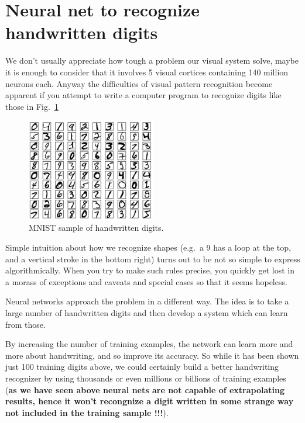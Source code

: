 \section{Neural net to recognize handwritten
		digits}\label{neural-net-to-recognize-handwritten-digits}

We don't usually appreciate how tough a problem our visual system solve,
maybe it is enough to consider that it involves 5 visual cortices
containing 140 million neurons each. Anyway the difficulties of visual
pattern recognition become apparent if you attempt to write a computer
program to recognize digits like those in Fig.~\ref{fig:mnist}

\begin{figure}[htb]
	\centering
	\includegraphics[width=0.5\textwidth]{figures/mnist_100_digits}
	\caption{MNIST sample of handwritten digits.}
	\label{fig:mnist}
\end{figure}

Simple intuition about how we recognize shapes (e.g.~a 9 has a loop at
the top, and a vertical stroke in the bottom right) turns out to be not
so simple to express algorithmically. When you try to make such rules
precise, you quickly get lost in a morass of exceptions and caveats and
special cases so that it seems hopeless.

Neural networks approach the problem in a different way. The idea is to
take a large number of handwritten digits and then develop a system
which can learn from those.

By increasing the number of training examples, the network can learn
more and more about handwriting, and so improve its accuracy. So while
it has been shown just 100 training digits above, we could certainly
build a better handwriting recognizer by using thousands or even
millions or billions of training examples (\textbf{as we have seen above
	neural nets are not capable of extrapolating results, hence it won't
	recongnize a digit written in some strange way not included in the
	training sample !!!}).

